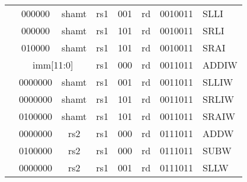 \begin{table}[p]
\begin{small}
\begin{center}
\begin{tabular}{p{0in}p{0.4in}p{0.05in}p{0.05in}p{0.05in}p{0.05in}p{0.4in}p{0.6in}p{0.4in}p{0.6in}p{0.7in}l}
&
\multicolumn{3}{|c|}{000000} &
\multicolumn{3}{c|}{shamt} &
\multicolumn{1}{c|}{rs1} &
\multicolumn{1}{c|}{001} &
\multicolumn{1}{c|}{rd} &
\multicolumn{1}{c|}{0010011} & SLLI \\
\cline{2-11}
  

&
\multicolumn{3}{|c|}{000000} &
\multicolumn{3}{c|}{shamt} &
\multicolumn{1}{c|}{rs1} &
\multicolumn{1}{c|}{101} &
\multicolumn{1}{c|}{rd} &
\multicolumn{1}{c|}{0010011} & SRLI \\
\cline{2-11}
  

&
\multicolumn{3}{|c|}{010000} &
\multicolumn{3}{c|}{shamt} &
\multicolumn{1}{c|}{rs1} &
\multicolumn{1}{c|}{101} &
\multicolumn{1}{c|}{rd} &
\multicolumn{1}{c|}{0010011} & SRAI \\
\cline{2-11}
  

&
\multicolumn{6}{|c|}{imm[11:0]} &
\multicolumn{1}{c|}{rs1} &
\multicolumn{1}{c|}{000} &
\multicolumn{1}{c|}{rd} &
\multicolumn{1}{c|}{0011011} & ADDIW \\
\cline{2-11}
  

&
\multicolumn{4}{|c|}{0000000} &
\multicolumn{2}{c|}{shamt} &
\multicolumn{1}{c|}{rs1} &
\multicolumn{1}{c|}{001} &
\multicolumn{1}{c|}{rd} &
\multicolumn{1}{c|}{0011011} & SLLIW \\
\cline{2-11}
  

&
\multicolumn{4}{|c|}{0000000} &
\multicolumn{2}{c|}{shamt} &
\multicolumn{1}{c|}{rs1} &
\multicolumn{1}{c|}{101} &
\multicolumn{1}{c|}{rd} &
\multicolumn{1}{c|}{0011011} & SRLIW \\
\cline{2-11}
  

&
\multicolumn{4}{|c|}{0100000} &
\multicolumn{2}{c|}{shamt} &
\multicolumn{1}{c|}{rs1} &
\multicolumn{1}{c|}{101} &
\multicolumn{1}{c|}{rd} &
\multicolumn{1}{c|}{0011011} & SRAIW \\
\cline{2-11}
  

&
\multicolumn{4}{|c|}{0000000} &
\multicolumn{2}{c|}{rs2} &
\multicolumn{1}{c|}{rs1} &
\multicolumn{1}{c|}{000} &
\multicolumn{1}{c|}{rd} &
\multicolumn{1}{c|}{0111011} & ADDW \\
\cline{2-11}
  

&
\multicolumn{4}{|c|}{0100000} &
\multicolumn{2}{c|}{rs2} &
\multicolumn{1}{c|}{rs1} &
\multicolumn{1}{c|}{000} &
\multicolumn{1}{c|}{rd} &
\multicolumn{1}{c|}{0111011} & SUBW \\
\cline{2-11}
  

&
\multicolumn{4}{|c|}{0000000} &
\multicolumn{2}{c|}{rs2} &
\multicolumn{1}{c|}{rs1} &
\multicolumn{1}{c|}{001} &
\multicolumn{1}{c|}{rd} &
\multicolumn{1}{c|}{0111011} & SLLW \\
\cline{2-11}
  


\end{tabular}
\end{center}
\end{small}
\end{table}
